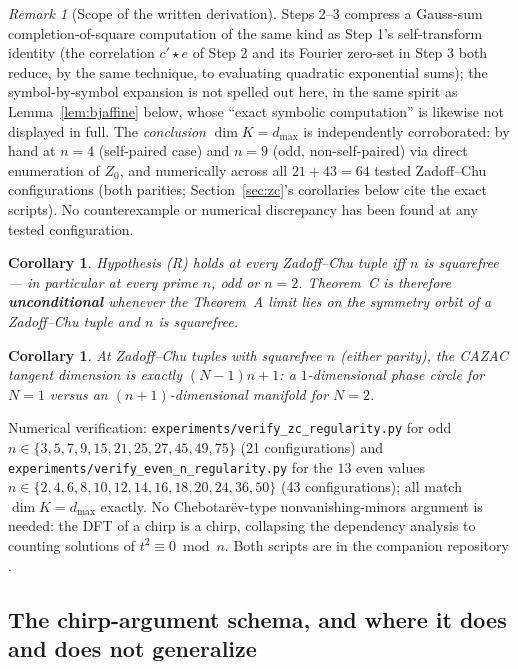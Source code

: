 \documentclass[11pt]{article}
\theoremstyle{plain}
\newtheorem{corollary}[theorem]{Corollary}
\theoremstyle{definition}
\theoremstyle{remark}
\newtheorem{remark}[theorem]{Remark}
\begin{document}
\begin{remark}[Scope of the written derivation]
Steps 2--3 compress a Gauss-sum completion-of-square computation of the
same kind as Step 1's self-transform identity (the correlation $c'\star e$
of Step 2 and its Fourier zero-set in Step 3 both reduce, by the same
technique, to evaluating quadratic exponential sums); the symbol-by-symbol
expansion is not spelled out here, in the same spirit as
Lemma~\ref{lem:bjaffine} below, whose ``exact symbolic computation'' is
likewise not displayed in full. The \emph{conclusion} $\dim K=d_{\max}$ is
independently corroborated: by hand at $n=4$ (self-paired case) and $n=9$
(odd, non-self-paired) via direct enumeration of $Z_0$, and numerically
across all $21+43=64$ tested Zadoff--Chu configurations (both parities;
Section~\ref{sec:zc}'s corollaries below cite the exact scripts). No
counterexample or numerical discrepancy has been found at any tested
configuration.
\end{remark}

\begin{corollary}\label{cor:D1}
Hypothesis (R) holds at every Zadoff--Chu tuple iff $n$ is squarefree ---
in particular at every prime $n$, odd or $n=2$. Theorem~C is therefore
\textbf{unconditional} whenever the Theorem~A limit lies on the symmetry
orbit of a Zadoff--Chu tuple and $n$ is squarefree.
\end{corollary}

\begin{corollary}\label{cor:D2}
At Zadoff--Chu tuples with squarefree $n$ (either parity), the CAZAC
tangent dimension is exactly $(N-1)n+1$: a $1$-dimensional phase circle for
$N=1$ versus an $(n+1)$-dimensional manifold for $N=2$.
\end{corollary}

Numerical verification: {\tt experiments/verify\_zc\_regularity.py} for odd
$n\in\{3,5,7,9,15,21,25,27,45,49,75\}$ (21 configurations) and
{\tt experiments/verify\_even\_n\_regularity.py} for the $13$ even values
$n\in\{2,4,6,8,10,12,14,16,18,20,24,36,50\}$ (43 configurations); all match
$\dim K=d_{\max}$ exactly. No Chebotar\"ev-type nonvanishing-minors
argument is needed: the DFT of a chirp is a chirp, collapsing the
dependency analysis to counting solutions of $t^2\equiv0\bmod n$. Both
scripts are in the companion repository \cite{CazacAlgorithmRepo}.

\subsection{The chirp-argument schema, and where it does and does not generalize}
\end{document}
